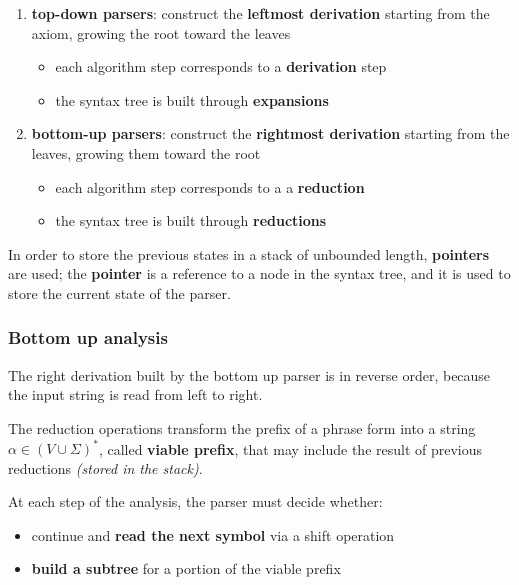 \documentclass[english]{article}
\begin{document}
\begin{enumerate}
  \item \textbf{top-down parsers}: construct the \textbf{leftmost derivation} starting from the axiom, growing the root toward the leaves
        \begin{itemize}
          \item each algorithm step corresponds to a \textbf{derivation} step
          \item the syntax tree is built through \textbf{expansions}
        \end{itemize}
  \item \textbf{bottom-up parsers}: construct the \textbf{rightmost derivation} starting from the leaves, growing them toward the root
        \begin{itemize}
          \item each algorithm step corresponds to a a \textbf{reduction}
          \item the syntax tree is built through \textbf{reductions}
        \end{itemize}
\end{enumerate}

\bigskip
In order to store the previous states in a stack of unbounded length, \textbf{pointers} are used;
the \textbf{pointer} is a reference to a node in the syntax tree, and it is used to store the current state of the parser.

\subsubsection{Bottom up analysis}

The right derivation built by the bottom up parser is in reverse order, because the input string is read from left to right.

The reduction operations transform the prefix of a phrase form into a string \(\alpha \in \left( V \cup \Sigma \right)^\ast\), called \textbf{viable prefix}, that may include the result of previous reductions \textit{(stored in the stack)}.

At each step of the analysis, the parser must decide whether:

\begin{itemize}
  \item continue and \textbf{read the next symbol} via a shift operation
  \item \textbf{build a subtree} for a portion of the viable prefix
\end{itemize}
\end{document}
